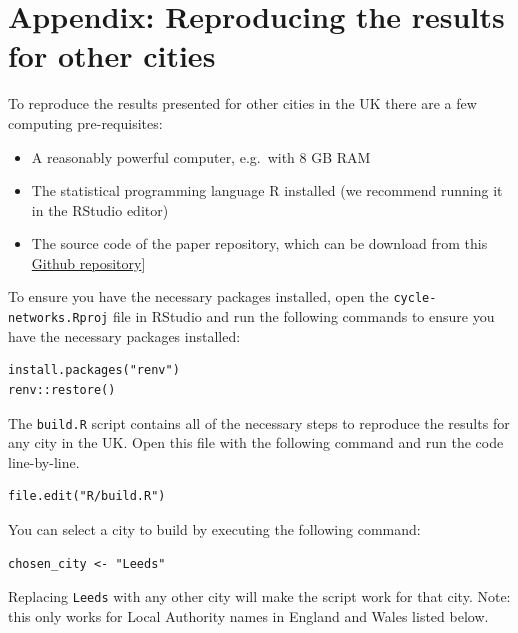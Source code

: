 \documentclass[
]{article}
\providecommand{\tightlist}{%
  \setlength{\itemsep}{0pt}\setlength{\parskip}{0pt}}
\begin{document}
\hypertarget{appendix-appendix}{%
\appendix}


\clearpage

\hypertarget{appendix-reproducing-the-results-for-other-cities}{%
\section{Appendix: Reproducing the results for other cities}\label{appendix-reproducing-the-results-for-other-cities}}

To reproduce the results presented for other cities in the UK there are a few computing pre-requisites:

\begin{itemize}
\tightlist
\item
  A reasonably powerful computer, e.g.~with 8 GB RAM
\item
  The statistical programming language R installed (we recommend running it in the RStudio editor)
\item
  The source code of the paper repository, which can be download from this \href{https://github.com/Hussein-Mahfouz/cycle-networks}{Github repository}{]}
\end{itemize}

To ensure you have the necessary packages installed, open the \texttt{cycle-networks.Rproj} file in RStudio and run the following commands to ensure you have the necessary packages installed:

\begin{verbatim}
install.packages("renv")
renv::restore()
\end{verbatim}

The \texttt{build.R} script contains all of the necessary steps to reproduce the results for any city in the UK.
Open this file with the following command and run the code line-by-line.

\begin{verbatim}
file.edit("R/build.R")
\end{verbatim}

You can select a city to build by executing the following command:

\begin{verbatim}
chosen_city <- "Leeds"
\end{verbatim}

Replacing \texttt{Leeds} with any other city will make the script work for that city.
Note: this only works for Local Authority names in England and Wales listed below.
\end{document}
